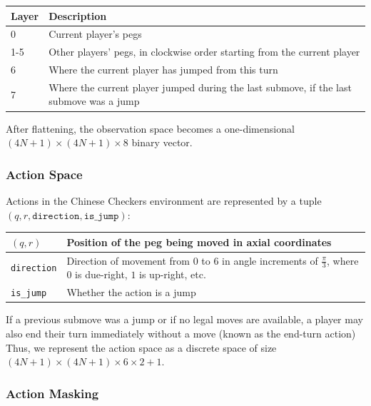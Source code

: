 \documentclass[12pt, a4paper, twocolumn]{article}
\begin{document}
\begin{center}
\begin{tabular}{|m{}|m{}|}
  \hline
  Layer & Description \\
  \hline
  0 & Current player's pegs \\
  1-5 & Other players' pegs, in clockwise order starting from the current player \\
  6 & Where the current player has jumped from this turn \\
  7 & Where the current player jumped during the last submove, if the last submove was a jump \\
  \hline
\end{tabular}
\end{center}

After flattening, the observation space becomes a one-dimensional $(4N + 1) \times (4N + 1) \times 8$ binary vector.


\subsubsection{Action Space}

Actions in the Chinese Checkers environment are represented by a tuple $(q, r, \texttt{direction}, \texttt{is\_jump})$:

\begin{center}
  \begin{tabular}{|m{}|m{}|}
    \hline
    $(q, r)$ & Position of the peg being moved in axial coordinates \\
    \hline
    \texttt{direction} & Direction of movement from $0$ to $6$ in angle increments of $\frac{\pi}{3}$, where $0$ is due-right, $1$ is up-right, etc. \\
    \hline
    \texttt{is\_jump} & Whether the action is a jump \\
    \hline
  \end{tabular}
  \end{center}

  If a previous submove was a jump or if no legal moves are available, a player may also end their turn immediately without a move (known as the end-turn action)  Thus, we represent the action space as a discrete space of size $(4N + 1) \times (4N + 1) \times 6 \times 2 + 1$.

\subsubsection{Action Masking}
\end{document}
